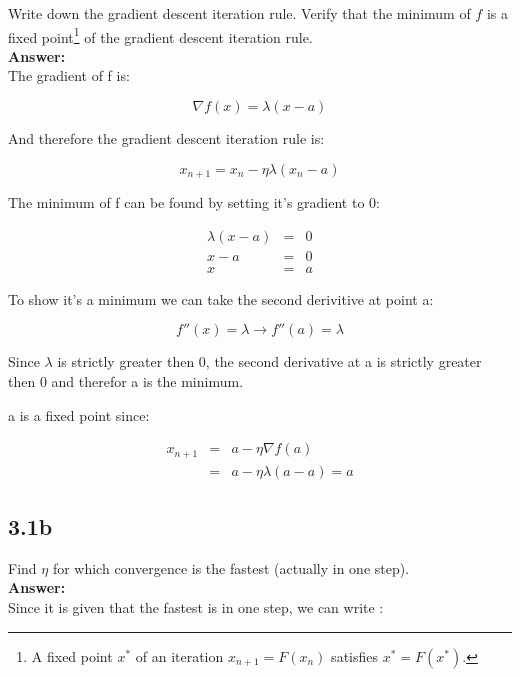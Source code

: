 \documentclass[a4paper]{article}
\begin{document}
Write down the gradient descent iteration rule. Verify that the minimum of $f$ is a fixed point\footnote{A fixed point $x^*$ of an iteration $x_{n+1} = F(x_n)$ satisfies $x^* = F(x^*)$.} of the gradient descent iteration rule.\\

\textbf{Answer:}\\

The gradient of f is:

\begin{equation}
\nabla f(x) = \lambda (x-a)
\end{equation}

And therefore the gradient descent iteration rule is:

\begin{equation}
x_{n+1} = x_n - \eta \lambda (x_n-a)
\end{equation}

The minimum of f can be found by setting it's gradient to 0:

\begin{eqnarray}
\lambda(x-a) &=& 0\\
x-a &=& 0 \\
x &=& a
\end{eqnarray}

To show it's a minimum we can take the second derivitive at point a:

\begin{equation}
f''(x) = \lambda \rightarrow f''(a) = \lambda
\end{equation}

Since $\lambda$ is strictly greater then 0, the second derivative at a is strictly greater then 0 and therefor a is the minimum.

a is a fixed point since:

\begin{eqnarray}
x_{n+1} &=& a - \eta \nabla f(a)\\
&=& a - \eta \lambda (a-a) = a
\end{eqnarray}

\subsection*{3.1b}

Find $\eta$ for which convergence is the fastest (actually in one step).\\

\textbf{Answer:}\\

Since it is given that the fastest is in one step, we can write :
\end{document}
